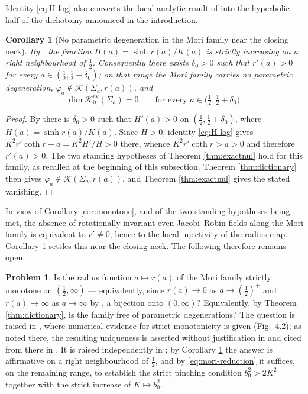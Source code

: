 \documentclass[11pt,a4paper]{amsart}
\theoremstyle{plain}
\newtheorem{corollary}[theorem]{Corollary}
\theoremstyle{definition}
\newtheorem{problem}[theorem]{Problem}
\newcommand{\Ker}{\mathcal{K}}
\begin{document}
Identity \eqref{eq:H-log} also converts the local analytic result of \cite{P1} into the hyperbolic half of the dichotomy announced in the introduction.

\begin{corollary}[No parametric degeneration in the Mori family near the closing neck]\label{cor:mori-local}
By \cite[Cor. 11.10]{P1}, the function $H(a)=\sinh r(a)/K(a)$ is strictly increasing on a right neighbourhood of $\tfrac12$. Consequently there exists $\delta_0>0$ such that $r'(a)>0$ for every $a\in(\tfrac12,\tfrac12+\delta_0)$; on that range the Mori family carries no parametric degeneration, $\varphi_a\notin\Ker(\Sigma_a,r(a))$, and
\[
\dim\Ker_0^{\mathrm{ev}}(\Sigma_a)=0\qquad\text{for every }a\in\bigl(\tfrac12,\tfrac12+\delta_0\bigr).
\]
\end{corollary}

\begin{proof}
By \cite[Cor. 11.10]{P1} there is $\delta_0>0$ such that $H'(a)>0$ on $(\tfrac12,\tfrac12+\delta_0)$, where $H(a)=\sinh r(a)/K(a)$. Since $H>0$, identity \eqref{eq:H-log} gives $K^2r'\coth r-a=K^2H'/H>0$ there, whence $K^2r'\coth r>a>0$ and therefore $r'(a)>0$. The two standing hypotheses of Theorem \ref{thm:exactnul} hold for this family, as recalled at the beginning of this subsection. Theorem \ref{thm:dictionary} then gives $\varphi_a\notin\Ker(\Sigma_a,r(a))$, and Theorem \ref{thm:exactnul} gives the stated vanishing.
\end{proof}

In view of Corollary \ref{cor:monotone}, and of the two standing hypotheses being met, the absence of rotationally invariant even Jacobi--Robin fields along the Mori family is equivalent to $r'\neq 0$, hence to the local injectivity of the radius map. Corollary \ref{cor:mori-local} settles this near the closing neck. The following therefore remains open.

\begin{problem}\label{prob:mori}
Is the radius function $a\mapsto r(a)$ of the Mori family strictly monotone on $(\tfrac12,\infty)$ --- equivalently, since $r(a)\to 0$ as $a\to(\tfrac12)^+$ and $r(a)\to\infty$ as $a\to\infty$ by \cite{P2}, a bijection onto $(0,\infty)$? Equivalently, by Theorem \ref{thm:dictionary}, is the family free of parametric degenerations? The question is raised in \cite[Rem.~4.3]{dO-thesis}, where numerical evidence for strict monotonicity is given (Fig.~4.2); as noted there, the resulting uniqueness is asserted without justification in \cite{LX18} and cited from there in \cite{Med23}. It is raised independently in \cite[Question 6.3]{P2}; by Corollary \ref{cor:mori-local} the answer is affirmative on a right neighbourhood of $\tfrac12$, and by \eqref{eq:mori-reduction} it suffices, on the remaining range, to establish the strict pinching condition $b_0^2>2K^2$ together with the strict increase of $K\mapsto b_0^2$.
\end{problem}
\end{document}
